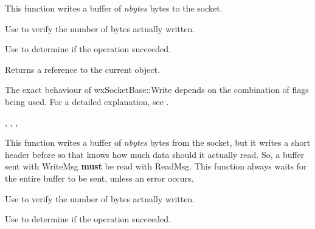 
This function writes a buffer of {\it nbytes} bytes to the socket.

Use  to verify the number of bytes actually written.

Use  to determine if the operation succeeded.





Returns a reference to the current object.


The exact behaviour of wxSocketBase::Write depends on the combination
of flags being used. For a detailed explanation, see .


, 
, 
, 

%
%
\label{wxsocketbasewritemsg}


This function writes a buffer of {\it nbytes} bytes from the socket, but it
writes a short header before so that  
knows how much data should it actually read. So, a buffer sent with WriteMsg 
{\bf must} be read with ReadMsg. This function always waits for the entire
buffer to be sent, unless an error occurs.

Use  to verify the number of bytes actually written.

Use  to determine if the operation succeeded.




